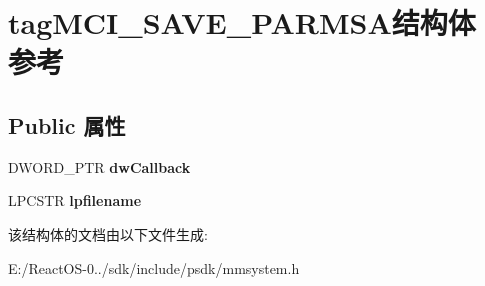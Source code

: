 \hypertarget{structtag_m_c_i___s_a_v_e___p_a_r_m_s_a}{}\section{tag\+M\+C\+I\+\_\+\+S\+A\+V\+E\+\_\+\+P\+A\+R\+M\+S\+A结构体 参考}
\label{structtag_m_c_i___s_a_v_e___p_a_r_m_s_a}
\subsection*{Public 属性}
\begin{DoxyCompactItemize}
\item 
\mbox{\label{structtag_m_c_i___s_a_v_e___p_a_r_m_s_a_abdbac7f09083cd611cbdebf20c74dd75}} 
D\+W\+O\+R\+D\+\_\+\+P\+TR {\bfseries dw\+Callback}
\item 
\mbox{\label{structtag_m_c_i___s_a_v_e___p_a_r_m_s_a_adb722cf7746b35667f736d321dbb28a0}} 
L\+P\+C\+S\+TR {\bfseries lpfilename}
\end{DoxyCompactItemize}


该结构体的文档由以下文件生成\+:\begin{DoxyCompactItemize}
\item 
E\+:/\+React\+O\+S-\/0../sdk/include/psdk/mmsystem.\+h\end{DoxyCompactItemize}

